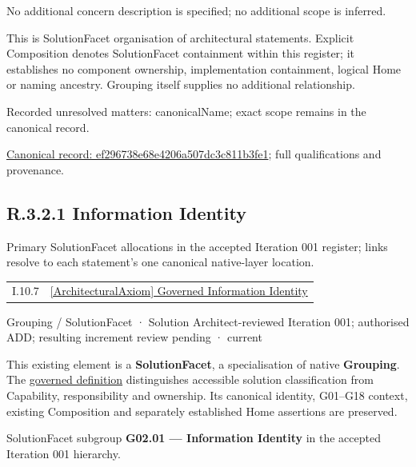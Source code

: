 No additional concern description is specified; no additional scope is inferred.



This is SolutionFacet organisation of architectural statements. Explicit Composition denotes SolutionFacet containment within this register; it establishes no component ownership, implementation containment, logical Home or naming ancestry. Grouping itself supplies no additional relationship.


{\small Recorded unresolved matters: canonicalName; exact scope remains in the canonical record.}\par
{\footnotesize \href{../../../../../../../continuum/grouping/ef296738e68e4206a507dc3c811b3fe1.md}{Canonical record: ef296738e68e4206a507dc3c811b3fe1}; full qualifications and provenance.}\par
\subsection*{R.3.2.1 Information Identity}
\label{navigation:R.3.2.1}

Primary SolutionFacet allocations in the accepted Iteration 001 register; links resolve to each statement’s one canonical native-layer location.\par
\begin{longtable}{p{.22\linewidth}p{.73\linewidth}}
I.10.7 & \hyperref[element:c2e7ee7597e64275b3523befd72c0987]{[ArchitecturalAxiom] Governed Information Identity} \\
\end{longtable}
\label{element:819aeed91d0544c3b7cc52e69aa46d72}
{\small Grouping / SolutionFacet · Solution Architect-reviewed Iteration 001; authorised ADD; resulting increment review pending · current}\par

This existing element is a \textbf{SolutionFacet}, a specialisation of native
\textbf{Grouping}. The \href{\detokenize{../../../../../../../governance/continuum-representation.md#solutionfacet-classification--1119-candidate}}{governed definition}
distinguishes accessible solution classification from Capability, responsibility
and ownership. Its canonical identity, G01–G18 context, existing Composition
and separately established Home assertions are preserved.



SolutionFacet subgroup \textbf{G02.01 — Information Identity} in the accepted Iteration 001 hierarchy.



